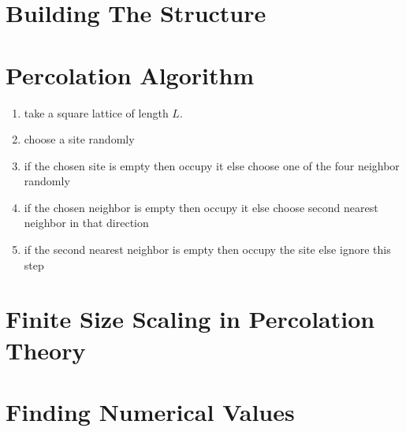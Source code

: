 \section{Building The Structure}
\section{Percolation Algorithm}
\begin{enumerate}
	\item take a square lattice of length $L$.
	\item choose a site randomly
	\item if the chosen site is empty then occupy it else choose one of the four neighbor randomly
	\item if the chosen neighbor is empty then occupy it else choose second nearest neighbor in that direction
	\item if the second nearest neighbor is empty then occupy the site else ignore this step
\end{enumerate}
\section{Finite Size Scaling in Percolation Theory}
\section{Finding Numerical Values}
